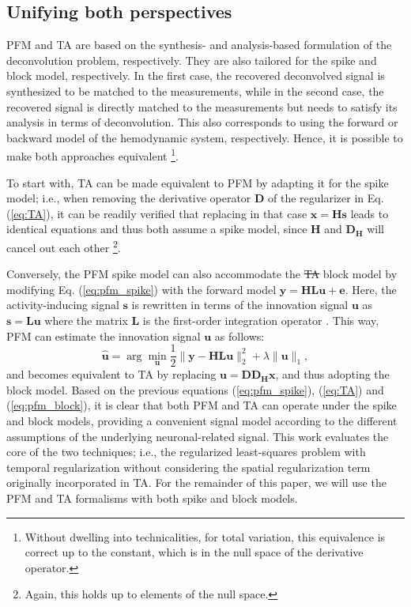 \subsection{Unifying both perspectives}
\label{sec:unifying_both_perspectives}
PFM and TA are based on the synthesis- and analysis-based formulation of the
deconvolution problem, respectively. They are also tailored for the spike and
block model, respectively. In the first case, the recovered deconvolved signal
is synthesized to be matched to the measurements, while in the second case, the
recovered signal is directly matched to the measurements but needs to satisfy
its analysis in terms of deconvolution. This also corresponds to using the
forward or backward model of the hemodynamic system, respectively. Hence, it is
possible to make both approaches equivalent
\citep{Elad2007Analysisversussynthesis}\footnote{Without dwelling into
technicalities, for total variation, this equivalence is correct up to the
constant, which is in the null space of the derivative operator.}.

To start with, TA can be made equivalent to PFM by adapting it for the spike
model; i.e., when removing the derivative operator $\mathbf{D}$ of the
regularizer in Eq. (\ref{eq:TA}), it can be readily verified that replacing in
that case $\mathbf{x}=\mathbf{Hs}$ leads to identical equations and thus both
assume a spike model, since $\mathbf{H}$ and $\mathbf{D_H}$ will cancel out each
other \citep{Karahanoglu2011SignalProcessingApproach}\footnote{Again, this holds
up to elements of the null space.}.

Conversely, the PFM spike model can also accommodate the
\sout{TA} block model by modifying Eq. (\ref{eq:pfm_spike})
with the forward model $\mathbf{y} = \mathbf{H L u} + \mathbf{e}$. Here, the
activity-inducing signal $\mathbf{s}$ is rewritten in terms of the innovation
signal $\mathbf{u}$ as $\mathbf{s}=\mathbf{Lu}$ where the matrix $\mathbf{L}$ is
the first-order integration operator
\citep{Cherkaoui2019SparsitybasedBlind,Urunuela2020StabilityBasedSparse}. This
way, PFM can estimate the innovation signal $\mathbf{u}$ as follows: 
\begin{equation}
    \label{eq:pfm_block}
    \hat{\mathbf{u}} = \arg \min_{\mathbf{u}} \frac{1}{2} \| \mathbf{y} - \mathbf{HLu} \|_2^2 + \lambda \| \mathbf{u} \|_1,
\end{equation}
and becomes equivalent to TA by replacing $\mathbf{u}=\mathbf{D D_H x}$, and
thus adopting the block model. Based on the previous equations
(\ref{eq:pfm_spike}), (\ref{eq:TA}) and (\ref{eq:pfm_block}), it is clear that
both PFM and TA can operate under the spike and block models, providing a
convenient signal model according to the different assumptions of the underlying
neuronal-related signal. This work evaluates the core of the two techniques;
i.e., the regularized least-squares problem with temporal regularization without
considering the spatial regularization term originally incorporated in TA. For
the remainder of this paper, we will use the PFM and TA formalisms with both
spike and block models. 

